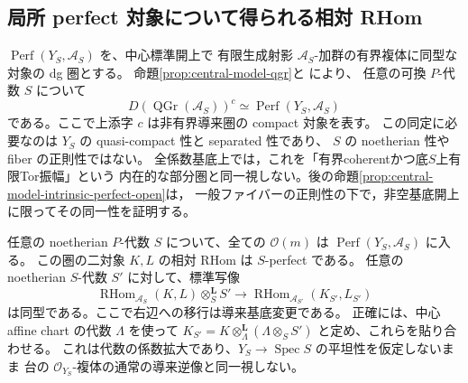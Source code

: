 \subsection{局所 perfect 対象について得られる相対 RHom}

$\operatorname{Perf}(Y_S,\mathscr A_S)$ を、中心標準開上で
有限生成射影 $\mathscr A_S$-加群の有界複体に同型な対象の dg 圏とする。
命題\ref{prop:central-model-qgr}と
\cite[Definitions~3.1, 3.13, Theorem~3.14]{BDGMinors}により、
任意の可換 $P$-代数 $S$ について
\[
 D(\operatorname{QGr}(\mathcal A_S))^c
 \simeq \operatorname{Perf}(Y_S,\mathscr A_S)
\]
である。ここで上添字 $c$ は非有界導来圏の compact 対象を表す。
この同定に必要なのは $Y_S$ の quasi-compact 性と separated 性であり、
$S$ の noetherian 性や fiber の正則性ではない。
全係数基底上では，これを「有界coherentかつ底$S$上有限Tor振幅」という
内在的な部分圏と同一視しない。後の命題\ref{prop:central-model-intrinsic-perfect-open}は，
一般ファイバーの正則性の下で，非空基底開上に限ってその同一性を証明する。

\begin{proposition}
\label{prop:central-model-perfect-rhom}
任意の noetherian $P$-代数 $S$ について、全ての $\mathcal O(m)$ は
$\operatorname{Perf}(Y_S,\mathscr A_S)$ に入る。
この圏の二対象 $K,L$ の相対 RHom は $S$-perfect である。
任意の noetherian $S$-代数 $S'$ に対して、標準写像
\[
 \operatorname{RHom}_{\mathscr A_S}(K,L)\otimes_S^{\mathbf L}S'
 \longrightarrow
 \operatorname{RHom}_{\mathscr A_{S'}}(K_{S'},L_{S'})
\]
は同型である。ここで右辺への移行は導来基底変更である。
正確には、中心 affine chart の代数 $\Lambda$ を使って
$K_{S'}=K\otimes_{\Lambda}^{\mathbf L}(\Lambda\otimes_SS')$
と定め、これらを貼り合わせる。
これは代数の係数拡大であり、$Y_S\to\operatorname{Spec}S$ の平坦性を仮定しないまま
台の $\mathcal O_{Y_S}$-複体の通常の導来逆像と同一視しない。
\end{proposition}

